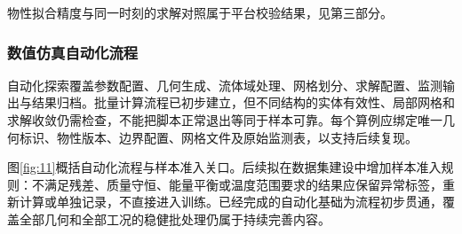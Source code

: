 \documentclass[UTF8]{midterm}
\begin{document}
物性拟合精度与同一时刻的求解对照属于平台校验结果，见第三部分。

\subsubsection{数值仿真自动化流程}
自动化探索覆盖参数配置、几何生成、流体域处理、网格划分、求解配置、监测输出与结果归档。批量计算流程已初步建立，但不同结构的实体有效性、局部网格和求解收敛仍需检查，不能把脚本正常退出等同于样本可靠。每个算例应绑定唯一几何标识、物性版本、边界配置、网格文件及原始监测表，以支持后续复现。

图\ref{fig:11}概括自动化流程与样本准入关口。后续拟在数据集建设中增加样本准入规则：不满足残差、质量守恒、能量平衡或温度范围要求的结果应保留异常标签，重新计算或单独记录，不直接进入训练。已经完成的自动化基础为流程初步贯通，覆盖全部几何和全部工况的稳健批处理仍属于持续完善内容。
\end{document}
